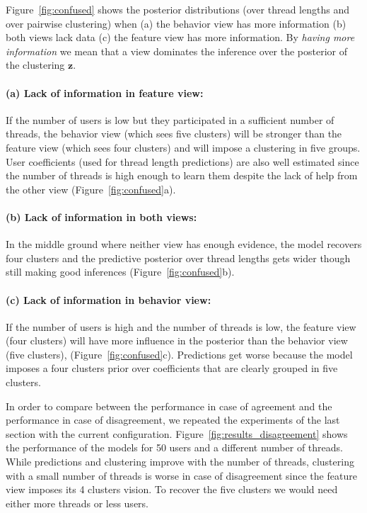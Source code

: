 \documentclass[smallextended]{svjour3}          %
\begin{document}
Figure~\ref{fig:confused} shows the posterior distributions (over thread lengths and over pairwise clustering) when (a) the behavior view has more information (b) both views lack data (c) the feature view has more information. By \textit{having more information} we mean that a view dominates the inference over the posterior of the clustering $\mathbf{z}$. 

\paragraph{(a) Lack of information in feature view:}
If the number of users is low but they participated in a sufficient number of threads, the behavior view (which sees five clusters) will be stronger than the feature view (which sees four clusters) and will impose a clustering in five groups. User coefficients (used for thread length predictions) are also well estimated since the number of threads is high enough to learn them despite the lack of help from the other view (Figure~\ref{fig:confused}a).

\paragraph{(b) Lack of information in both views:}
In the middle ground where neither view has enough evidence, the model recovers four clusters and the predictive posterior over thread lengths gets wider though still making good inferences (Figure~\ref{fig:confused}b).

\paragraph{(c) Lack of information in behavior view:}
If the number of users is high and the number of threads is low, the feature view (four clusters) will have more influence in the posterior than the behavior view (five clusters), (Figure~\ref{fig:confused}c). Predictions get worse because the model imposes a four clusters prior over coefficients that are clearly grouped in five clusters.

In order to compare between the performance in case of agreement and the performance in case of disagreement, we repeated the experiments of the last section with the current configuration. 
Figure~\ref{fig:results_disagreement} shows the performance of the models for 50 users and a different number of threads. While predictions and clustering improve with the number of threads, clustering with a small number of threads is worse in case of disagreement since the feature view imposes its 4 clusters vision. To recover the five clusters we would need either more  threads or less users.
\end{document}
